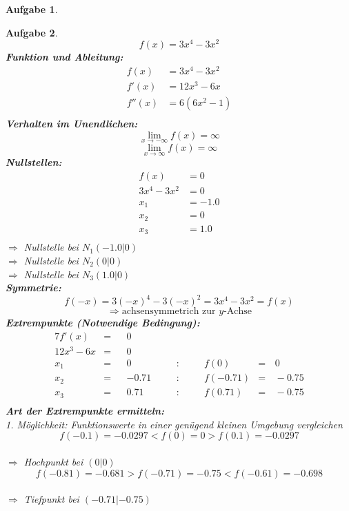 \documentclass[12pt]{article}
\theoremstyle{note}
\newtheorem{aufgabe}{Aufgabe}
\begin{document}
\begin{flushleft}
\begin{aufgabe}
\end{aufgabe}\clearpage\begin{aufgabe} ~  
$$f(x)=3 x^{4} - 3 x^{2}$$ 
{\bf Funktion und Ableitung:} 
\begin{align*} 
f(x)&=3 x^{4} - 3 x^{2}\\ 
f'(x)&=12 x^{3} - 6 x\\ 
f''(x)&=6 \left(6 x^{2} - 1\right)\\ 
\end{align*} 
{\bf Verhalten im Unendlichen:} 
\[ \lim_{x\rightarrow -\infty} f(x) =\infty\]\[ \lim_{x\rightarrow\infty} f(x) =\infty\]{\bf Nullstellen:} 
\begin{align*} 
f(x)&=0 \\ 
3 x^{4} - 3 x^{2}&=0 \\ 
x_1&=-1.0\\ 
x_2&=0\\ 
x_3&=1.0\\ 
\end{align*} 
$\Rightarrow$ Nullstelle bei $N_1(-1.0|0)$ \\ 
$\Rightarrow$ Nullstelle bei $N_2(0|0)$ \\ 
$\Rightarrow$ Nullstelle bei $N_3(1.0|0)$ \\ 
{\bf Symmetrie:} 
\[ f(-x)=3 (-x)^{4} - 3 (-x)^{2}=3 x^{4} - 3 x^{2}=f(x) \]\[ \Rightarrow \text{achsensymmetrich zur $y$-Achse} \]{\bf Extrempunkte (Notwendige Bedingung):} 
\begin{alignat*}{7} 
f'(x)&=& &0& \\ 
12 x^{3} - 6 x&=& &0& \\ 
x_1&=& &0& \quad &:& \quad &f(0)&=& \,0\\ 
x_2&=& &-0.71& \quad &:& \quad &f(-0.71)&=& \,-0.75\\ 
x_3&=& &0.71& \quad &:& \quad &f(0.71)&=& \,-0.75\\ 
\end{alignat*} 
{\bf Art der Extrempunkte ermitteln:} \\[1em] 
{\em 1. M\"oglichkeit:} Funktionswerte in einer gen\"ugend kleinen Umgebung vergleichen \\ 
$$f(-0.1)=-0.0297  <  f(0)=0  >  f(0.1)=-0.0297$$\\ 
$\Rightarrow$ Hochpunkt bei $(0|0)$ \\ 
\vspace{1em}$$f(-0.81)=-0.681  >  f(-0.71)=-0.75  <   f(-0.61)=-0.698$$\\ 
$\Rightarrow$ Tiefpunkt bei $(-0.71|-0.75)$ \\ 

\end{aufgabe}
\end{flushleft}
\end{document}
